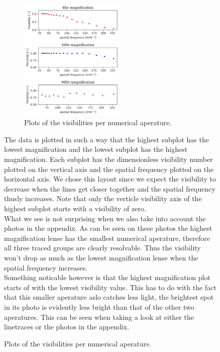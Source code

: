 \begin{figure}[h!]
{\begin{figure}
    \centering
    \vspace{-3mm}
    \includegraphics[width=0.55\textwidth,keepaspectratio]{afbeeldingen/visibilities.png}
    \caption{Plots of the visibilities per numerical aperature.}
    \label{fig:visibilities}
    \vspace{0mm}
\end{figure}

\vspace{-7mm}
The data is plotted in such a way that the highest subplot has the lowest magnification and the lowest subplot has the highest magnification. Each subplot has the dimensionless visibility number plotted on the vertical axis and the spatial frequency plotted on the horizontal axis. We chose this layout since we expect the visibility to decrease when the lines get closer together and the spatial frequency thusly increases. Note that only the verticle visibility axis of the highest subplot starts with a visibility of zero.\\
What we see is not surprising when we also take into account the photos in the appendix. As can be seen on these photos the highest magnification lense has the smallest numerical aperature, therefore all three traced groups are clearly resolvable. Thus the visibility won't drop as much as the lowest magnification lense when the spatial frequency increases.\\
Something noticable however is that the highest magnification plot starts of with the lowest visibility value. This has to do with the fact that this smaller aperature aslo catches less light, the brightest spot in its photo is evidently less bright than that of the other two aperatures. This can be seen when taking a look at either the linetraces or the photos in the appendix.


}
\end{figure}

